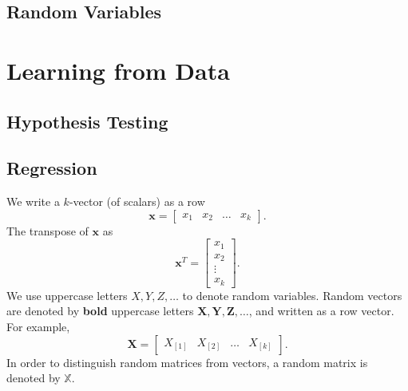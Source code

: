 \documentclass[
]{book}
\theoremstyle{definition}
\theoremstyle{definition}
\theoremstyle{definition}
\theoremstyle{definition}
\theoremstyle{remark}
\begin{document}
\hypertarget{random-variables}{%
\chapter{Random Variables}\label{random-variables}}

\hypertarget{part-learning-from-data}{%
\part{Learning from Data}\label{part-learning-from-data}}

\hypertarget{hypothesis-testing}{%
\chapter{Hypothesis Testing}\label{hypothesis-testing}}

\hypertarget{regression}{%
\chapter{Regression}\label{regression}}

We write a \(k\)-vector (of scalars) as a row
\[
{\boldsymbol{x}}=
\begin{bmatrix}
x_1 &
x_2 &
\ldots &
x_k
\end{bmatrix}.
\]
The transpose of \({\boldsymbol{x}}\) as
\[
{\boldsymbol{x}}^T=
\begin{bmatrix}
x_1 \\ x_2\\ \vdots \\ x_k
\end{bmatrix}.
\]
We use uppercase letters \(X,Y,Z,\ldots\) to denote random variables. Random vectors are denoted by \textbf{bold} uppercase letters \({\boldsymbol{X}},{\boldsymbol{Y}},{\boldsymbol{Z}},\ldots\), and written as a row vector. For example, \[
{\boldsymbol{X}}=
\begin{bmatrix}
X_{[1]} &
X_{[2]} &
\ldots &
X_{[k]}
\end{bmatrix}.
\]
In order to distinguish random matrices from vectors, a random matrix is denoted by \({\mathbb{X}}\).
\end{document}
